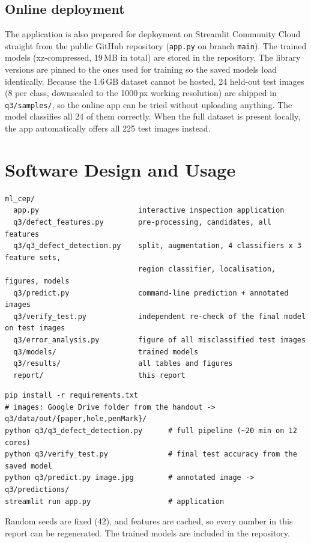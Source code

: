 \documentclass[11pt,a4paper]{report}
\begin{document}
\section*{Online deployment}
The application is also prepared for deployment on Streamlit Community Cloud straight from
the public GitHub repository (\texttt{app.py} on branch \texttt{main}). The trained models
(xz-compressed, 19\,MB in total) are stored in the repository. The library versions are
pinned to the ones used for training so the saved models load identically. Because the
1.6\,GB dataset cannot be hosted, 24 held-out test images (8 per class, downscaled to the
1000\,px working resolution) are shipped in \texttt{q3/samples/}, so the online app can be
tried without uploading anything. The model classifies all 24 of them correctly. When the
full dataset is present locally, the app automatically offers all 225 test images instead.

\chapter{Software Design and Usage}
\begin{lstlisting}
ml_cep/
  app.py                       interactive inspection application
  q3/defect_features.py        pre-processing, candidates, all features
  q3/q3_defect_detection.py    split, augmentation, 4 classifiers x 3 feature sets,
                               region classifier, localisation, figures, models
  q3/predict.py                command-line prediction + annotated images
  q3/verify_test.py            independent re-check of the final model on test images
  q3/error_analysis.py         figure of all misclassified test images
  q3/models/                   trained models
  q3/results/                  all tables and figures
  report/                      this report
\end{lstlisting}
\begin{lstlisting}
pip install -r requirements.txt
# images: Google Drive folder from the handout -> q3/data/out/{paper,hole,penMark}/
python q3/q3_defect_detection.py      # full pipeline (~20 min on 12 cores)
python q3/verify_test.py              # final test accuracy from the saved model
python q3/predict.py image.jpg        # annotated image -> q3/predictions/
streamlit run app.py                  # application
\end{lstlisting}
Random seeds are fixed (42), and features are cached, so every number in this report can be
regenerated. The trained models are included in the repository.
\end{document}
